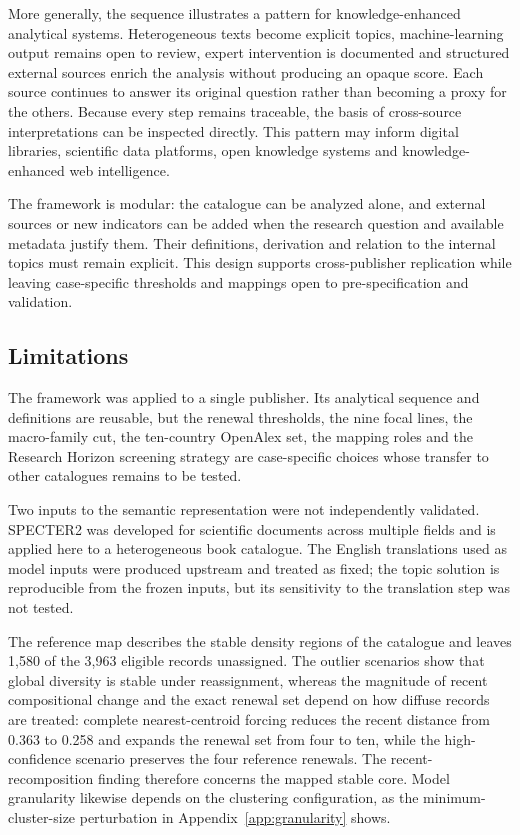 \documentclass[futureinternet,article,submit,moreauthors]{Definitions/mdpi}
\begin{document}
More generally, the sequence illustrates a pattern for knowledge-enhanced analytical systems. Heterogeneous texts become explicit topics, machine-learning output remains open to review, expert intervention is documented and structured external sources enrich the analysis without producing an opaque score. Each source continues to answer its original question rather than becoming a proxy for the others. Because every step remains traceable, the basis of cross-source interpretations can be inspected directly. This pattern may inform digital libraries, scientific data platforms, open knowledge systems and knowledge-enhanced web intelligence.

The framework is modular: the catalogue can be analyzed alone, and external sources or new indicators can be added when the research question and available metadata justify them. Their definitions, derivation and relation to the internal topics must remain explicit. This design supports cross-publisher replication while leaving case-specific thresholds and mappings open to pre-specification and validation.

\subsection{Limitations}\label{subsec:limitations}

The framework was applied to a single publisher. Its analytical sequence and definitions are reusable, but the renewal thresholds, the nine focal lines, the macro-family cut, the ten-country OpenAlex set, the mapping roles and the Research Horizon screening strategy are case-specific choices whose transfer to other catalogues remains to be tested.

Two inputs to the semantic representation were not independently validated. SPECTER2 was developed for scientific documents across multiple fields \citep{singh2023scirepeval} and is applied here to a heterogeneous book catalogue. The English translations used as model inputs were produced upstream and treated as fixed; the topic solution is reproducible from the frozen inputs, but its sensitivity to the translation step was not tested.

The reference map describes the stable density regions of the catalogue and leaves 1,580 of the 3,963 eligible records unassigned. The outlier scenarios show that global diversity is stable under reassignment, whereas the magnitude of recent compositional change and the exact renewal set depend on how diffuse records are treated: complete nearest-centroid forcing reduces the recent distance from 0.363 to 0.258 and expands the renewal set from four to ten, while the high-confidence scenario preserves the four reference renewals. The recent-recomposition finding therefore concerns the mapped stable core. Model granularity likewise depends on the clustering configuration, as the minimum-cluster-size perturbation in Appendix~\ref{app:granularity} shows.
\end{document}
